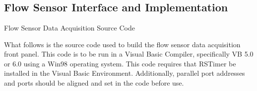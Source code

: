 

\doublespacing
\thispagestyle{empty} 
\section*{}
\vspace{30mm}
\begin{center}
\subsection{Flow Sensor Interface and Implementation}
\vspace{20mm}
Flow Sensor Data Acquisition Source Code
\end{center}
\begin{flushleft}
 What follows is the source code used to build the flow sensor data acquisition front panel. This code is to be run in a Visual Basic Compiler, specifically VB 5.0 or 6.0 using a Win98 operating system. This code requires that RSTimer be installed in the Visual Basic Environment. Additionally, parallel port addresses and ports should be aligned and set in the code before use.
\end{flushleft}

